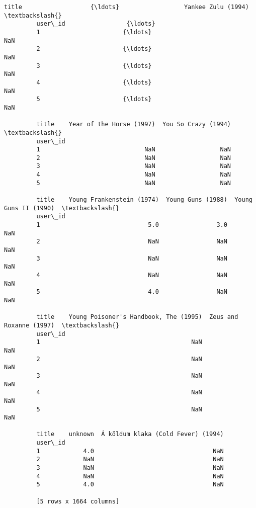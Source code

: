 \documentclass[11pt]{article}
\begin{document}
\begin{Verbatim}[commandchars=\\\{\}]
         title                   {\ldots}                  Yankee Zulu (1994)  \textbackslash{}
         user\_id                 {\ldots}                                       
         1                       {\ldots}                                 NaN   
         2                       {\ldots}                                 NaN   
         3                       {\ldots}                                 NaN   
         4                       {\ldots}                                 NaN   
         5                       {\ldots}                                 NaN   
         
         title    Year of the Horse (1997)  You So Crazy (1994)  \textbackslash{}
         user\_id                                                  
         1                             NaN                  NaN   
         2                             NaN                  NaN   
         3                             NaN                  NaN   
         4                             NaN                  NaN   
         5                             NaN                  NaN   
         
         title    Young Frankenstein (1974)  Young Guns (1988)  Young Guns II (1990)  \textbackslash{}
         user\_id                                                                       
         1                              5.0                3.0                   NaN   
         2                              NaN                NaN                   NaN   
         3                              NaN                NaN                   NaN   
         4                              NaN                NaN                   NaN   
         5                              4.0                NaN                   NaN   
         
         title    Young Poisoner's Handbook, The (1995)  Zeus and Roxanne (1997)  \textbackslash{}
         user\_id                                                                   
         1                                          NaN                      NaN   
         2                                          NaN                      NaN   
         3                                          NaN                      NaN   
         4                                          NaN                      NaN   
         5                                          NaN                      NaN   
         
         title    unknown  Á köldum klaka (Cold Fever) (1994)  
         user\_id                                               
         1            4.0                                 NaN  
         2            NaN                                 NaN  
         3            NaN                                 NaN  
         4            NaN                                 NaN  
         5            4.0                                 NaN  
         
         [5 rows x 1664 columns]
\end{Verbatim}
            
\end{document}
